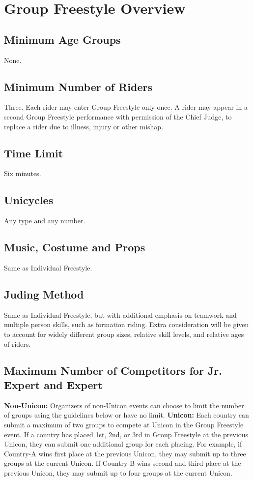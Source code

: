 \section{Group Freestyle Overview}

\subsection{Minimum Age Groups}
None.

\subsection{Minimum Number of Riders}
Three.
Each rider may enter Group Freestyle only once.
A rider may appear in a second Group Freestyle performance with permission of the Chief Judge, to replace a rider due to illness, injury or other mishap.

\subsection{Time Limit}
Six minutes.

\subsection{Unicycles}
Any type and any number.

\subsection{Music, Costume and Props}
Same as Individual Freestyle.

\subsection{Juding Method}
Same as Individual Freestyle, but with additional emphasis on teamwork and multiple person skills, such as formation riding.
Extra consideration will be given to account for widely different group sizes, relative skill levels, and relative ages of riders.

\subsection{Maximum Number of Competitors for Jr. Expert and Expert}
\textbf{Non-Unicon:} Organizers of non-Unicon events can choose to limit the number of groups using the guidelines below or have no limit.
\textbf{Unicon:} Each country can submit a maximum of two groups to compete at Unicon in the Group Freestyle event.
If a country has placed 1st, 2nd, or 3rd in Group Freestyle at the previous Unicon, they can submit one additional group for each placing.
For example, if Country-A wins first place at the previous Unicon, they may submit up to three groups at the current Unicon.
If Country-B wins second and third place at the previous Unicon, they may submit up to four groups at the current Unicon.

